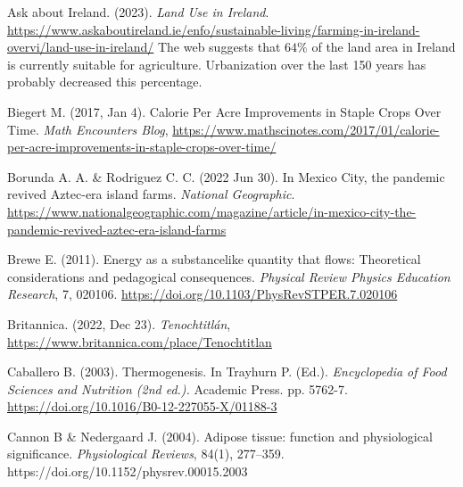 \documentclass[onecolumn]{article}
\begin{document}
\begin{thebibliography}{99}

Ask about Ireland.
(2023).
\textit{Land Use in Ireland}.
\url{https://www.askaboutireland.ie/enfo/sustainable-living/farming-in-ireland-overvi/land-use-in-ireland/}
The web suggests that $64\%$ of the land area in Ireland is currently suitable for agriculture.  Urbanization over the last 150 years has probably decreased this percentage.  


Biegert M.
(2017, Jan 4).
Calorie Per Acre Improvements in Staple Crops Over Time.
\textit{Math Encounters Blog},
\url{https://www.mathscinotes.com/2017/01/calorie-per-acre-improvements-in-staple-crops-over-time/}

Borunda A. A. \& Rodriguez C. C.
(2022 Jun 30).
In Mexico City, the pandemic revived Aztec-era island farms.
\textit{National Geographic}.
\url{https://www.nationalgeographic.com/magazine/article/in-mexico-city-the-pandemic-revived-aztec-era-island-farms}

Brewe E.
(2011).
Energy as a substancelike quantity that flows: Theoretical considerations
and pedagogical consequences.
\textit{Physical Review Physics Education Research},
7, 020106.
\url{https://doi.org/10.1103/PhysRevSTPER.7.020106}

Britannica.
(2022, Dec 23).
\textit{Tenochtitlán},
\url{https://www.britannica.com/place/Tenochtitlan}

Caballero B. 
(2003). 
Thermogenesis.
In Trayhurn P. (Ed.). 
\textit{Encyclopedia of Food Sciences and Nutrition (2nd ed.).}
Academic Press.
pp. 5762-7.
\url{https://doi.org/10.1016/B0-12-227055-X/01188-3}

Cannon B \& Nedergaard J. 
(2004).
Adipose tissue: function and physiological significance.
\textit{Physiological Reviews}, 
84(1), 
277--359.
https://doi.org/10.1152/physrev.00015.2003


\end{thebibliography}
\end{document}
